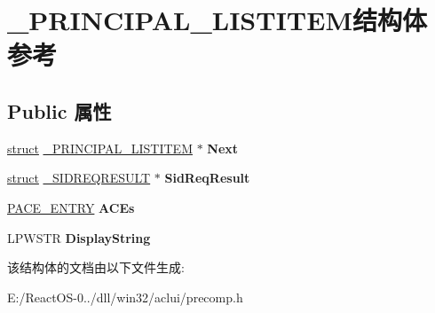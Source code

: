\hypertarget{struct___p_r_i_n_c_i_p_a_l___l_i_s_t_i_t_e_m}{}\section{\+\_\+\+P\+R\+I\+N\+C\+I\+P\+A\+L\+\_\+\+L\+I\+S\+T\+I\+T\+E\+M结构体 参考}
\label{struct___p_r_i_n_c_i_p_a_l___l_i_s_t_i_t_e_m}
\subsection*{Public 属性}
\begin{DoxyCompactItemize}
\item 
\mbox{\label{struct___p_r_i_n_c_i_p_a_l___l_i_s_t_i_t_e_m_a25f9113fa0d9ec70b1ed905ca6f82bcc}} 
\hyperlink{interfacestruct}{struct} \hyperlink{struct___p_r_i_n_c_i_p_a_l___l_i_s_t_i_t_e_m}{\+\_\+\+P\+R\+I\+N\+C\+I\+P\+A\+L\+\_\+\+L\+I\+S\+T\+I\+T\+EM} $\ast$ {\bfseries Next}
\item 
\mbox{\label{struct___p_r_i_n_c_i_p_a_l___l_i_s_t_i_t_e_m_a0b515dfa71459e3a69bfb1f8aba618da}} 
\hyperlink{interfacestruct}{struct} \hyperlink{struct___s_i_d_r_e_q_r_e_s_u_l_t}{\+\_\+\+S\+I\+D\+R\+E\+Q\+R\+E\+S\+U\+LT} $\ast$ {\bfseries Sid\+Req\+Result}
\item 
\mbox{\label{struct___p_r_i_n_c_i_p_a_l___l_i_s_t_i_t_e_m_ada4d9a9044b6eb48dd21c655baa2cc9a}} 
\hyperlink{struct___a_c_e___e_n_t_r_y}{P\+A\+C\+E\+\_\+\+E\+N\+T\+RY} {\bfseries A\+C\+Es}
\item 
\mbox{\label{struct___p_r_i_n_c_i_p_a_l___l_i_s_t_i_t_e_m_ada396fa88b4c0ff04935951ef95ea8e8}} 
L\+P\+W\+S\+TR {\bfseries Display\+String}
\end{DoxyCompactItemize}


该结构体的文档由以下文件生成\+:\begin{DoxyCompactItemize}
\item 
E\+:/\+React\+O\+S-\/0../dll/win32/aclui/precomp.\+h\end{DoxyCompactItemize}
